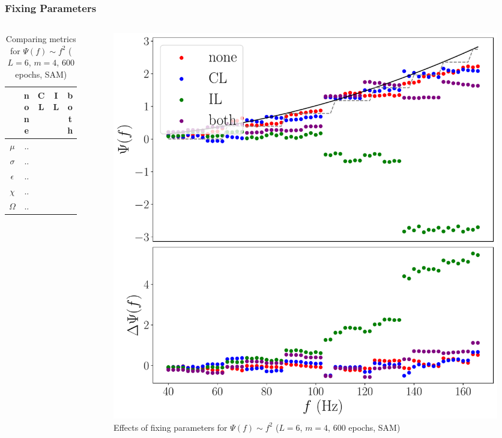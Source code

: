 \documentclass{beamer}
\begin{document}
\begin{frame}
\frametitle{Fixing Parameters}
\begin{columns}
\begin{column}{0.5\textwidth}
\begin{table}
\begin{tabular}{c || c| c | c| c }
&none & CL & IL & both \\ \hline \hline 
$\mu$ & ..   \\
$\sigma$ & ..  \\
$\epsilon$  &.. \\
$\chi$ & .. \\ \hline 
$\Omega$ & ..
\end{tabular}
\caption{Comparing metrics for $\Psi(f) \sim f^2$ ($L=6$, $m=4$, 600 epochs, SAM)}
\end{table}
\end{column}
\begin{column}{0.5\textwidth}
\begin{figure}
\centering 
\includegraphics[width=\textwidth]{im/phase_RP_comp_quadratic_m4}
\caption{Effects of fixing parameters for $\Psi(f) \sim f^2$ ($L=6$, $m=4$, 600 epochs, SAM)}
\end{figure}
\end{column}
\end{columns}
\end{frame}
\end{document}
